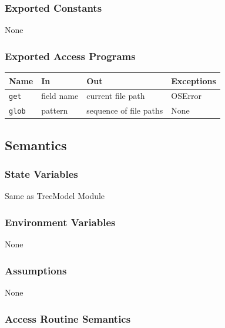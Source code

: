 \documentclass[12pt, titlepage]{article}
\begin{document}
\subsubsection{Exported Constants}


None




\subsubsection{Exported Access Programs}


\begin{center}
\begin{tabular}{p{3cm} p{4cm} p{4cm} p{2cm}}
\hline
    \textbf{Name} & \textbf{In} & \textbf{Out} & \textbf{Exceptions} \\
\hline
    \lstinline|get| & field name & current file path & OSError \\
    \lstinline|glob| & pattern & sequence of file paths & None \\
\hline
\end{tabular}
\end{center}




\subsection{Semantics}


\subsubsection{State Variables}


Same as TreeModel Module




\subsubsection{Environment Variables}


None




\subsubsection{Assumptions}


None




\subsubsection{Access Routine Semantics}
\end{document}
